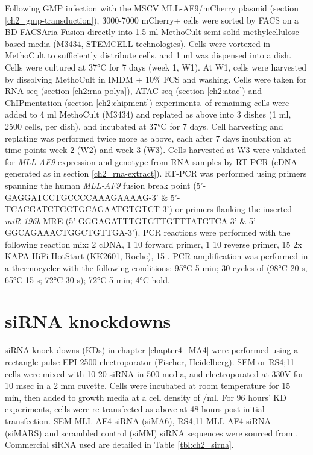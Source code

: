 Following GMP infection with the MSCV MLL-AF9/mCherry plasmid (section \ref{ch2_gmp-transduction}), 3000-7000 mCherry+ cells were sorted by FACS on a BD FACSAria Fusion directly into 1.5 ml MethoCult semi-solid
methylcellulose-based media (M3434, STEMCELL technologies). Cells were vortexed in MethoCult to sufficiently distribute cells, and 1 ml was dispensed into a dish. Cells were cultured at 37°C for 7 days (week 1, W1). At W1, cells were harvested by dissolving MethoCult in IMDM + 10\% FCS and washing. Cells were taken for RNA-seq (section \ref{ch2:rna-polya}), ATAC-seq (section \ref{ch2:atac}) and ChIPmentation (section \ref{ch2:chipment}) experiments.  of remaining cells were added to 4 ml MethoCult (M3434) and replated as above into 3 dishes (1 ml, 2500 cells, per dish), and incubated at 37°C for 7 days. Cell harvesting and replating was performed twice more as above, each after 7 days incubation at time points week 2 (W2) and week 3 (W3). Cells harvested at W3 were validated for \textit{MLL-AF9} expression and \mybmre{} genotype from RNA samples by RT-PCR (cDNA generated as in section \ref{ch2_rna-extract}). RT-PCR was performed using primers spanning the human \textit{MLL-AF9} fusion break point (5'-GAGGATCCTGCCCCAAAGAAAAG-3' \& 5'-TCACGATCTGCTGCAGAATGTGTCT-3') or primers flanking the inserted \textit{miR-196b} MRE (5'-GGGAGATTTGTGTTGTTTATGTCA-3' \& 5'-GGCAGAAACTGGCTGTTGA-3'). PCR reactions were performed with the following reaction mix: 2 \microl{} cDNA, 1 \microl{} 10 \microm{} forward primer, 1 \microl{} 10 \microm{} reverse primer, 15 \microl{} 2x KAPA HiFi HotStart (KK2601, Roche), 15 \microl{} \water{}. PCR amplification was performed in a thermocycler with the following conditions: 95°C 5 min; 30 cycles of (98°C 20 s, 65°C 15 s; 72°C 30 s); 72°C 5 min; 4°C hold.

\section{\label{ch2_sirna}siRNA knockdowns}

siRNA knock-downs (KDs) in chapter \ref{chapter4_MA4} were performed using a rectangle pulse EPI 2500 electroporator (Fischer, Heidelberg).  SEM or RS4;11 cells were mixed with 10 \microl{} 20 \microm{} siRNA in 500 \microl{} media, and electroporated at 330V for 10 msec in a 2 mm cuvette. Cells were incubated at room temperature for 15 min, then added to growth media at a cell density of /ml. For 96 hours' KD experiments, cells were re-transfected as above at 48 hours post initial transfection. SEM MLL-AF4 siRNA (siMA6), RS4;11 MLL-AF4 siRNA (siMARS) and scrambled control (siMM) siRNA sequences were sourced from \cite{thomas_targeting_2005}. Commercial siRNA used are detailed in Table \ref{tbl:ch2_sirna}. 

